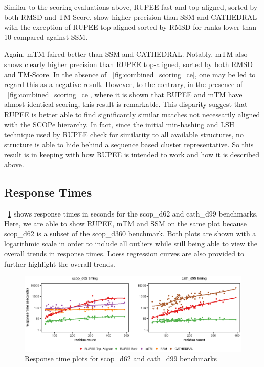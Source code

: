 \documentclass[letter,center,fleqn]{NAR}
\begin{document}
Similar to the scoring evaluations above, RUPEE fast and top-aligned, sorted by both RMSD and TM-Score, show higher precision than SSM and CATHEDRAL with the exception of RUPEE top-aligned sorted by RMSD for ranks lower than 10 compared against SSM. 

Again, mTM faired better than SSM and CATHEDRAL. 
Notably, mTM also shows clearly higher precision than RUPEE top-aligned, sorted by both RMSD and TM-Score. 
In the absence of \figurename~\ref{fig:combined_scoring_ce}, one may be led to regard this as a negative result. 
However, to the contrary, in the presence of \figurename~\ref{fig:combined_scoring_ce}, where it is shown that RUPEE and mTM have almost identical scoring, this result is remarkable. 
This disparity suggest that RUPEE is better able to find significantly similar matches not necessarily aligned with the SCOPe hierarchy. 
In fact, since the initial min-hashing and LSH technique used by RUPEE check for similarity to all available structures, no structure is able to hide behind a sequence based cluster representative. 
So this result is in keeping with how RUPEE is intended to work and how it is described above. 

\subsection{Response Times}

\figurename~\ref{fig:combined_response} shows response times in seconds for the scop\_d62 and cath\_d99 benchmarks. 
Here, we are able to show RUPEE, mTM and SSM on the same plot because scop\_d62 is a subset of the scop\_d360 benchmark. 
Both plots are shown with a logarithmic scale in order to include all outliers while still being able to view the overall trends in response times. 
Loess regression curves are also provided to further highlight the overall trends. 

\begin{figure}[tb]
\begin{center}
\includegraphics{combined_response}
\end{center}
\caption{Response time plots for scop\_d62 and cath\_d99 benchmarks}
\label{fig:combined_response}
\end{figure}
\end{document}
